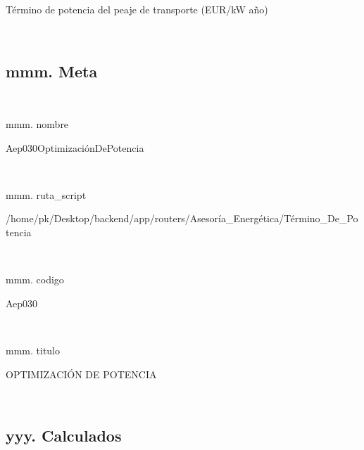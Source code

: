 \documentclass[a4paper,10pt]{article}
\begin{document}
\begin{Form}
\begin{table}[H]
{                        }
                        \caption{Término de potencia del peaje de transporte (EUR/kW año)}
                    \end{table}
                    

\
\newpage 
\subsection{mmm. Meta}\

mmm. nombre

Aep030OptimizaciónDePotencia

\

mmm. ruta_script

/home/pk/Desktop/backend/app/routers/Asesoría_Energética/Término_De_Potencia

\

mmm. codigo

Aep030

\

mmm. titulo

OPTIMIZACIÓN DE POTENCIA

\
\newpage 
\subsection{yyy. Calculados}\
\fi
\end{Form}
\end{document}
